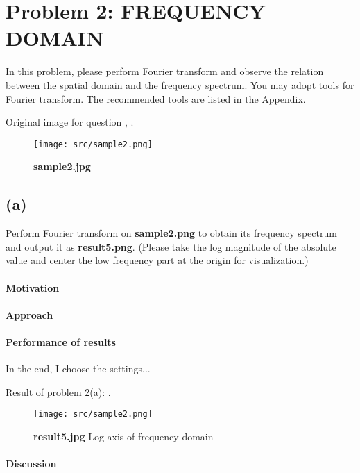\newpage
\section{Problem 2: FREQUENCY DOMAIN}\label{problem-2-frequency-domain}
In this problem, please perform Fourier transform and observe the relation between the spatial domain and the frequency spectrum. You may adopt tools for Fourier transform. The recommended tools are listed in the Appendix.

Original image  for question  , .
\begin{figure}
    \centering
    \texttt{[image: src/sample2.png]}
    \caption{\textbf{sample2.jpg}}
    \label{sample2}
\end{figure}

\subsection{(a)}\label{2_a}
Perform Fourier transform on \textbf{sample2.png} to obtain its frequency spectrum and output it as \textbf{result5.png}. (Please take the log magnitude of the absolute value and center the low frequency part at the origin for visualization.)

\paragraph{Motivation}

\paragraph{Approach}

\paragraph{Performance of results}
In the end, I choose the \alert{settings}...

Result of problem 2(a): .
\begin{figure}
    \centering
    \texttt{[image: src/sample2.png]}
    \caption{\textbf{result5.jpg} Log axis of frequency domain}
    \label{result5}
\end{figure}

\paragraph{Discussion}

